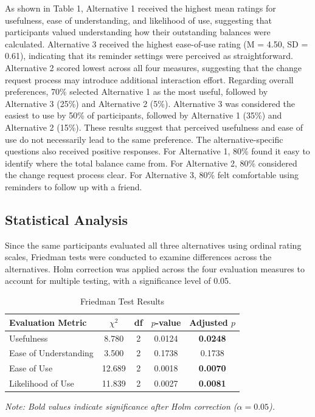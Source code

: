 \documentclass[letterpaper]{jdf}
\begin{document}
As shown in Table 1, Alternative 1 received the highest mean ratings for usefulness, ease of understanding, and likelihood of use, suggesting that participants valued understanding how their outstanding balances were calculated. Alternative 3 received the highest ease-of-use rating (M = 4.50, SD = 0.61), indicating that its reminder settings were perceived as straightforward. Alternative 2 scored lowest across all four measures, suggesting that the change request process may introduce additional interaction effort.
Regarding overall preferences, 70\% selected Alternative 1 as the most useful, followed by Alternative 3 (25\%) and Alternative 2 (5\%). Alternative 3 was considered the easiest to use by 50\% of participants, followed by Alternative 1 (35\%) and Alternative 2 (15\%). These results suggest that perceived usefulness and ease of use do not necessarily lead to the same preference.
The alternative-specific questions also received positive responses. For Alternative 1, 80\% found it easy to identify where the total balance came from. For Alternative 2, 80\% considered the change request process clear. For Alternative 3, 80\% felt comfortable using reminders to follow up with a friend.

\subsection{Statistical Analysis}
Since the same participants evaluated all three alternatives using ordinal rating scales, Friedman tests were conducted to examine differences across the alternatives. Holm correction was applied across the four evaluation measures to account for multiple testing, with a significance level of 0.05.

\begin{table}[!htbp]
    \centering
    \small
    \setlength{\tabcolsep}{6pt}
    \caption{Friedman Test Results}
    \label{tab:friedman}
    \begin{tabular}{lcccc}
        \toprule
        Evaluation Metric & $\chi^2$ & df & $p$-value & Adjusted $p$ \\
        \midrule
        Usefulness            & 8.780  & 2 & 0.0124 & \textbf{0.0248} \\
        Ease of Understanding & 3.500  & 2 & 0.1738 & 0.1738 \\
        Ease of Use           & 12.689 & 2 & 0.0018 & \textbf{0.0070} \\
        Likelihood of Use     & 11.839 & 2 & 0.0027 & \textbf{0.0081} \\
        \bottomrule
    \end{tabular}

    \vspace{2pt}
    {\footnotesize \textit{Note: Bold values indicate significance after Holm correction ($\alpha=0.05$).}}
\end{table}
\end{document}
